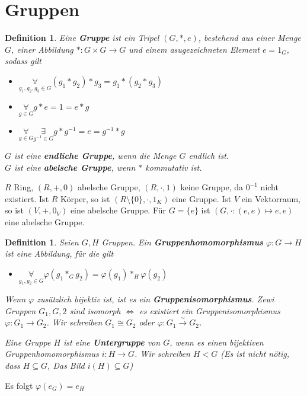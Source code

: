 \documentclass{article}
\newtheorem{defi}[thm]{Definition}
\begin{document}
\section{Gruppen}
\begin{defi}
    Eine \textbf{Gruppe} ist ein Tripel $(G,*,e)$, bestehend
    aus einer Menge $G$, einer Abbildung
    $*:G\times G\rightarrow G$ und einem asugezeichneten
    Element $e=1_G$, sodass gilt
    \begin{itemize}
        \item $\underset{g_1,g_2,g_3\in G}\forall
            (g_1*g_2)*g_3=g_1*(g_2*g_3)$
        \item $\underset{g\in G}\forall g*e=1=e*g$
        \item $\underset{g\in G}\forall\underset{g^{-1}\in G}
            \exists g*g^{-1}=e=g^{-1}*g$
    \end{itemize}
    $G$ ist eine \textbf{endliche Gruppe}, wenn die Menge
    $G$ endlich ist.\\
    $G$ ist eine \textbf{abelsche Gruppe}, wenn $*$
    kommutativ ist.
\end{defi}
\color{purple}
$R$ Ring, $(R,+,0)$ abelsche Gruppe, $(R,\cdot, 1)$ keine
Gruppe, da $0^{-1}$ nicht existiert. Ist $R$ Körper,
so ist $(R\setminus\{0\},\cdot, 1_K)$ eine Gruppe.
Ist $V$ ein Vektorraum, so ist $(V,+,0_V)$ eine abelsche
Gruppe. Für $G=\{e\}$ ist $(G,\cdot:(e,e)\mapsto e, e)$
eine abelsche Gruppe.
\color{black}
\begin{defi}
    Seien $G,H$ Gruppen. Ein \textbf{Gruppenhomomorphismus}
    $\varphi:G\rightarrow H$ ist eine Abbildung, für die
    gilt
    \begin{itemize}
        \item $\underset{g_1,g_2\in G}\forall
            \varphi(g_1*_G g_2)=\varphi(g_1)*_H\varphi(g_2)$
    \end{itemize}
    Wenn $\varphi$ zusätzlich bijektiv ist, ist es ein
    \textbf{Gruppenisomorphismus}. Zewi Gruppen $G_1,G,2$
    sind isomorph $\Leftrightarrow$ es existiert ein
    Gruppenisomorphismus $\varphi:G_1\rightarrow G_2$.
    Wir schreiben $G_1\cong G_2$ oder $\varphi:G_1
    \overset{\sim}\rightarrow G_2$.

    Eine Gruppe $H$ ist eine \textbf{Untergruppe} von $G$,
    wenn es einen bijektiven Gruppenhomomorphismus
    $i:H\to G$. Wir schreiben $H<G$
    (Es ist nicht nötig, dass $H\subseteq G$, Das Bild
    $i(H)\subseteq G$)
\end{defi}
\color{blue}
Es folgt $\varphi(e_G)=e_H$\\
\end{document}

